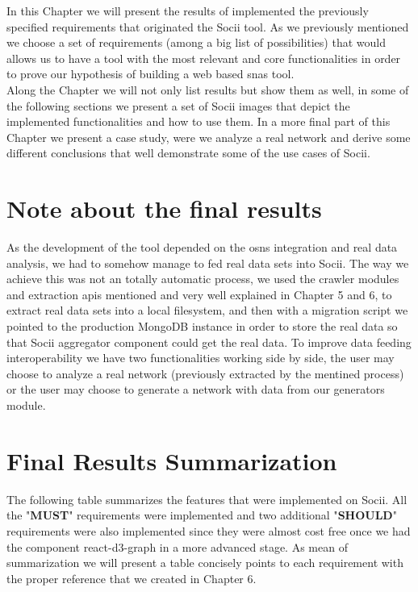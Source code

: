 In this Chapter we will present the results of implemented the previously specified requirements that originated the Socii tool. As we previously mentioned we
choose a set of requirements (among a big list of possibilities) that would allows us to have a tool with the most relevant and core functionalities
in order to prove our hypothesis of building a web based \glspl{sna} tool.\\
\indent Along the Chapter we will not only list results but show them as well, in some of the following sections we present a set of Socii images that depict the implemented functionalities and how to use them. In a more final part of this Chapter we present a case study, were we analyze a real network and derive some different conclusions that well demonstrate some of the use cases of Socii.

\section{Note about the final results}

As the development of the tool depended on the \glspl{osn} integration and real data analysis, we had to somehow manage to fed real data sets into
Socii. The way we achieve this was not an totally automatic process, we used the crawler modules and extraction \glspl{api} mentioned and very well explained in Chapter 5 and 6, to extract real data sets into a local filesystem, and then with a migration script we pointed to the production MongoDB instance in order to store the real data so that Socii aggregator component could get the real data. To improve data feeding interoperability we have two functionalities working side by side, the user may choose to analyze a real network (previously extracted by the mentined process) or the user may choose to generate a network with data from our generators module.


\section{Final Results Summarization}

The following table summarizes the features that were implemented on Socii. All the "\textbf{MUST}" requirements were implemented
and two additional "\textbf{SHOULD}" requirements were also implemented since they were almost cost free once we had the
component react-d3-graph in a more advanced stage. As mean of summarization we will present a table concisely points to
each requirement with the proper reference that we created in Chapter 6.


